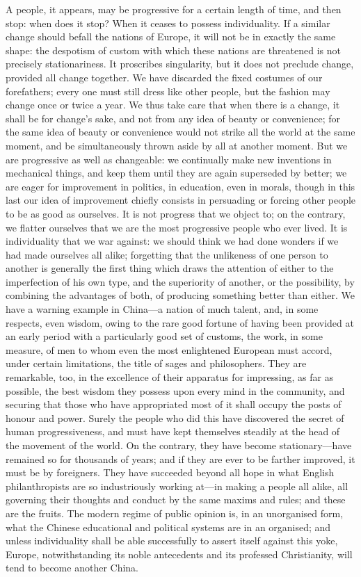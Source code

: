 \documentclass[11pt,openany]{book}
\begin{document}
A people, it appears, may be progressive for a certain length of time, and then stop: when does it stop? When it ceases to possess individuality. If a similar change should befall the nations of Europe, it will not be in exactly the same shape: the despotism of custom with which these nations are threatened is not precisely stationariness. It proscribes singularity, but it does not preclude change, provided all change together. We have discarded the fixed costumes of our forefathers; every one must still dress like other people, but the fashion may change once or twice a year. We thus take care that when there is a change, it shall be for change's sake, and not from any idea of beauty or convenience; for the same idea of beauty or convenience would not strike all the world at the same moment, and be simultaneously thrown aside by all at another moment. But we are progressive as well as changeable: we continually make new inventions in mechanical things, and keep them until they are again superseded by better; we are eager for improvement in politics, in education, even in morals, though in this last our idea of improvement chiefly consists in persuading or forcing other people to be as good as ourselves. It is not progress that we object to; on the contrary, we flatter ourselves that we are the most progressive people who ever lived. It is individuality that we war against: we should think we had done wonders if we had made ourselves all alike; forgetting that the unlikeness of one person to another is generally the first thing which draws the attention of either to the imperfection of his own type, and the superiority of another, or the possibility, by combining the advantages of both, of producing something better than either. We have a warning example in China---a nation of much talent, and, in some respects, even wisdom, owing to the rare good fortune of having been provided at an early period with a particularly good set of customs, the work, in some measure, of men to whom even the most enlightened European must accord, under certain limitations, the title of sages and philosophers. They are remarkable, too, in the excellence of their apparatus for impressing, as far as possible, the best wisdom they possess upon every mind in the community, and securing that those who have appropriated most of it shall occupy the posts of honour and power. Surely the people who did this have discovered the secret of human progressiveness, and must have kept themselves steadily at the head of the movement of the world. On the contrary, they have become stationary---have remained so for thousands of years; and if they are ever to be farther improved, it must be by foreigners. They have succeeded beyond all hope in what English philanthropists are so industriously working at---in making a people all alike, all governing their thoughts and conduct by the same maxims and rules; and these are the fruits. The modern regime of public opinion is, in an unorganised form, what the Chinese educational and political systems are in an organised; and unless individuality shall be able successfully to assert itself against this yoke, Europe, notwithstanding its noble antecedents and its professed Christianity, will tend to become another China.
\end{document}
